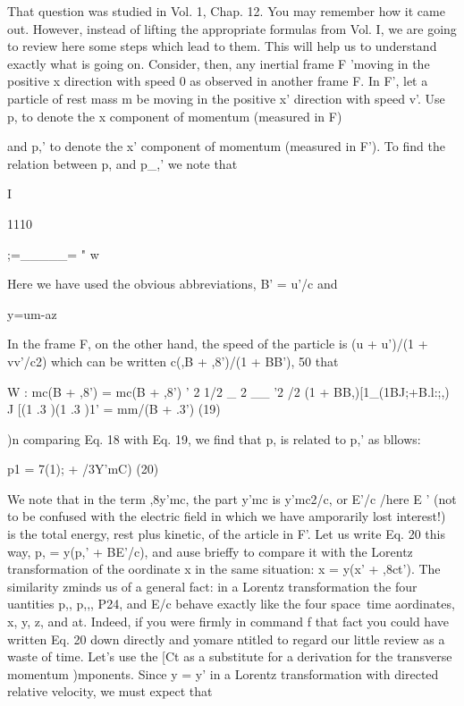 That question was studied in Vol. 1, Chap. 12. You may remember
how it came out. However, instead of lifting the appropriate formulas
from Vol. I, we are going to review here some steps which lead
to them. This will help us to understand exactly what is going on.
Consider, then, any inertial frame F 'moving in the positive x direction
with speed 0 as observed in another frame F. In F', let a particle
of rest mass m be moving in the positive x' direction with speed v'.
Use p, to denote the x component of momentum (measured in F)

and p,' to denote the x' component of momentum (measured in F').
To find the relation between p, and p_,' we note that

I

1110

;=_____= " w

Here we have used the obvious abbreviations, B' = u'/c and

y=um-az

In the frame F, on the other hand, the speed of the particle is
(u + u')/(1 + vv'/c2) which can be written c(,B + ,8')/(1 + BB'),
50 that
\begin{equation}
\end{equation}

W : mc(B + ,8') = mc(B + ,8')
' 2 1/2 _ 2 __ '2 /2
(1 + BB,)[1_(1BJ;+B.l:;,) J [(1 .3 )(1 .3 )1'
= mm/(B + .3') (19)
\begin{equation}
\end{equation}

)n comparing Eq. 18 with Eq. 19, we find that p, is related to p,' as
bllows:

p1 = 7(1); + /3Y'mC) (20)
\begin{equation}
\end{equation}

We note that in the term ,8y'mc, the part y'mc is y'mc2/c, or E'/c
/here E ' (not to be confused with the electric field in which we have
amporarily lost interest!) is the total energy, rest plus kinetic, of the
article in F'. Let us write Eq. 20 this way, p, = y(p,' + BE'/c), and
ause brieffy to compare it with the Lorentz transformation of the
oordinate x in the same situation: x = y(x' + ,8ct'). The similarity
zminds us of a general fact: in a Lorentz transformation the four
uantities p,, p,,, P24, and E/c behave exactly like the four space~time
aordinates, x, y, z, and at. Indeed, if you were firmly in command
f that fact you could have written Eq. 20 down directly and yomare
ntitled to regard our little review as a waste of time. Let's use the
[Ct as a substitute for a derivation for the transverse momentum
)mponents. Since y = y' in a Lorentz transformation with
directed relative velocity, we must expect that

